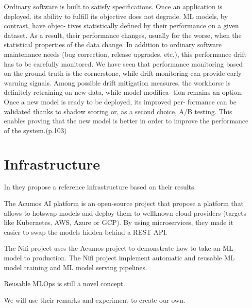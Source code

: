 Ordinary software is built to satisfy specifications. Once an application is deployed,
its ability to fulfill its objective does not degrade. ML models, by contrast, have objec‐
tives statistically defined by their performance on a given dataset. As a result, their
performance changes, usually for the worse, when the statistical properties of the data
change.
In addition to ordinary software maintenance needs (bug correction, release
upgrades, etc.), this performance drift has to be carefully monitored. We have seen
that performance monitoring based on the ground truth is the cornerstone, while
drift monitoring can provide early warning signals. Among possible drift mitigation
measures, the workhorse is definitely retraining on new data, while model modifica‐
tion remains an option. Once a new model is ready to be deployed, its improved per‐
formance can be validated thanks to shadow scoring or, as a second choice, A/B
testing. This enables proving that the new model is better in order to improve the
performance of the system.\cite{treveil2020introducing}(p.103)


\section{Infrastructure}
In\cite{10855428} they propose a reference infrastructure based on their results.

The Acumos AI platform\cite{10690392} is an open-source project that propose a platform that allows to hotswap models and deploy
them to wellknown cloud providers (targets like Kubernetes, AWS, Azure or GCP).
By using microservices, they made it easier to swap the models hidden behind a REST API\@.

The Nifi project\cite{10346079} uses the Acumos project to demonstrate how to take an ML model
to production.
The Nifi project implement automatic and reusable ML model training and ML model serving pipelines.

Reusable MLOps is still a novel concept\cite{10690392}.

We will use their remarks and experiment to create our own.


